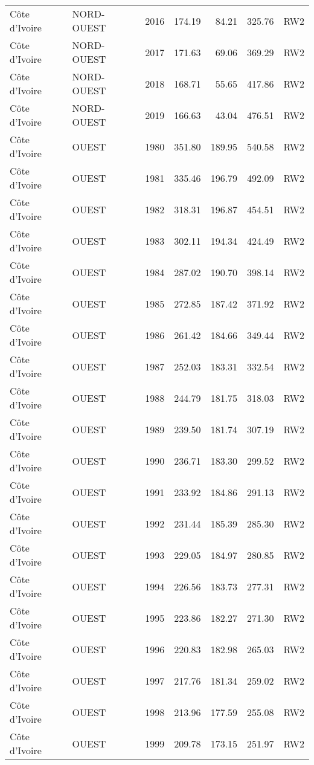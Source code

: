 \begin{longtable}{lllrrrl}
  C\^{o}te d'Ivoire & NORD-OUEST & 2016 & 174.19 & 84.21 & 325.76 & RW2 \\ 
  C\^{o}te d'Ivoire & NORD-OUEST & 2017 & 171.63 & 69.06 & 369.29 & RW2 \\ 
  C\^{o}te d'Ivoire & NORD-OUEST & 2018 & 168.71 & 55.65 & 417.86 & RW2 \\ 
  C\^{o}te d'Ivoire & NORD-OUEST & 2019 & 166.63 & 43.04 & 476.51 & RW2 \\ 
  C\^{o}te d'Ivoire & OUEST & 1980 & 351.80 & 189.95 & 540.58 & RW2 \\ 
  C\^{o}te d'Ivoire & OUEST & 1981 & 335.46 & 196.79 & 492.09 & RW2 \\ 
  C\^{o}te d'Ivoire & OUEST & 1982 & 318.31 & 196.87 & 454.51 & RW2 \\ 
  C\^{o}te d'Ivoire & OUEST & 1983 & 302.11 & 194.34 & 424.49 & RW2 \\ 
  C\^{o}te d'Ivoire & OUEST & 1984 & 287.02 & 190.70 & 398.14 & RW2 \\ 
  C\^{o}te d'Ivoire & OUEST & 1985 & 272.85 & 187.42 & 371.92 & RW2 \\ 
  C\^{o}te d'Ivoire & OUEST & 1986 & 261.42 & 184.66 & 349.44 & RW2 \\ 
  C\^{o}te d'Ivoire & OUEST & 1987 & 252.03 & 183.31 & 332.54 & RW2 \\ 
  C\^{o}te d'Ivoire & OUEST & 1988 & 244.79 & 181.75 & 318.03 & RW2 \\ 
  C\^{o}te d'Ivoire & OUEST & 1989 & 239.50 & 181.74 & 307.19 & RW2 \\ 
  C\^{o}te d'Ivoire & OUEST & 1990 & 236.71 & 183.30 & 299.52 & RW2 \\ 
  C\^{o}te d'Ivoire & OUEST & 1991 & 233.92 & 184.86 & 291.13 & RW2 \\ 
  C\^{o}te d'Ivoire & OUEST & 1992 & 231.44 & 185.39 & 285.30 & RW2 \\ 
  C\^{o}te d'Ivoire & OUEST & 1993 & 229.05 & 184.97 & 280.85 & RW2 \\ 
  C\^{o}te d'Ivoire & OUEST & 1994 & 226.56 & 183.73 & 277.31 & RW2 \\ 
  C\^{o}te d'Ivoire & OUEST & 1995 & 223.86 & 182.27 & 271.30 & RW2 \\ 
  C\^{o}te d'Ivoire & OUEST & 1996 & 220.83 & 182.98 & 265.03 & RW2 \\ 
  C\^{o}te d'Ivoire & OUEST & 1997 & 217.76 & 181.34 & 259.02 & RW2 \\ 
  C\^{o}te d'Ivoire & OUEST & 1998 & 213.96 & 177.59 & 255.08 & RW2 \\ 
  C\^{o}te d'Ivoire & OUEST & 1999 & 209.78 & 173.15 & 251.97 & RW2 \\ 

\end{longtable}
